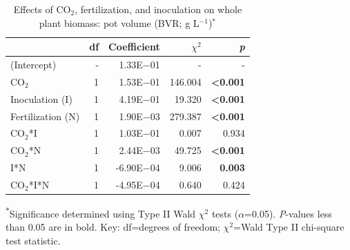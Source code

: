 \begin{table}[]
    \centering
    \caption[Effects of CO$_2$, fertilization, and inoculation on whole plant biomass: pot volume]{Effects of CO$_2$, fertilization, and inoculation on whole plant biomass: pot volume (BVR; g L$^{-1}$)$^*$}
    \label{table:tab.d3}
        \begin{tabular}{p{3.5cm}p{0.5cm}p{1.75cm}p{1.5cm}p{1.5cm}}
            \hline
            & \multicolumn{1}{r}{df} & \multicolumn{1}{r}{Coefficient}    & \multicolumn{1}{r}{$\chi^2$}  & \multicolumn{1}{r}{\textit{p}}
            \\
            \hline
    (Intercept)       & \multicolumn{1}{r}{-}       & \multicolumn{1}{r}{1.33E$-$01}    & \multicolumn{1}{r}{-}         & \multicolumn{1}{r}{-}               \\
    CO$_2$               & \multicolumn{1}{r}{1}    & \multicolumn{1}{r}{1.53E$-$01}    & \multicolumn{1}{r}{146.004}   & \multicolumn{1}{r}{\textbf{<0.001}} \\
    Inoculation (I)   & \multicolumn{1}{r}{1}       & \multicolumn{1}{r}{4.19E$-$01}    & \multicolumn{1}{r}{19.320}    & \multicolumn{1}{r}{\textbf{<0.001}} \\
    Fertilization (N) & \multicolumn{1}{r}{1}       & \multicolumn{1}{r}{1.90E$-$03}    & \multicolumn{1}{r}{279.387}   & \multicolumn{1}{r}{\textbf{<0.001}} \\
    CO$_2$*I             & \multicolumn{1}{r}{1}    & \multicolumn{1}{r}{1.03E$-$01}    & \multicolumn{1}{r}{0.007}     & \multicolumn{1}{r}{0.934}           \\
    CO$_2$*N             & \multicolumn{1}{r}{1}    & \multicolumn{1}{r}{2.44E$-$03}    & \multicolumn{1}{r}{49.725}    & \multicolumn{1}{r}{\textbf{<0.001}} \\
    I*N               & \multicolumn{1}{r}{1}       & \multicolumn{1}{r}{-6.90E$-$04}   & \multicolumn{1}{r}{9.006}     & \multicolumn{1}{r}{\textbf{0.003}}  \\
    CO$_2$*I*N           & \multicolumn{1}{r}{1}    & \multicolumn{1}{r}{-4.95E$-$04}   & \multicolumn{1}{r}{0.640}     & \multicolumn{1}{r}{0.424} \\
    \hline
    \end{tabular}%
\end{table}
\begin{singlespace}
    \noindent \textsuperscript{$*$}Significance determined using Type II Wald $\chi^2$ tests ($\alpha$=0.05). \textit{P}-values less than 0.05 are in bold. Key: df=degrees of freedom; $\chi^2$=Wald Type II chi-square test statistic.
\end{singlespace}
\clearpage

